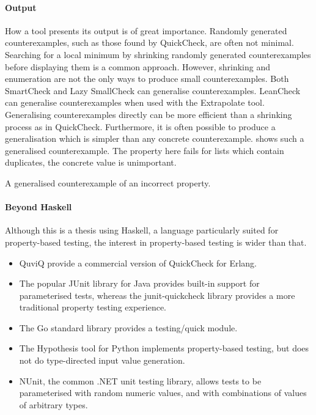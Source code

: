 \paragraph{Output}
How a tool presents its output is of great importance.  Randomly
generated counterexamples, such as those found by
QuickCheck\cite{claessen2000}, are often not minimal.  Searching for a
local minimum by shrinking randomly generated counterexamples before
displaying them is a common approach.  However, shrinking and
enumeration are not the only ways to produce small counterexamples.
Both SmartCheck\cite{pike2014} and Lazy SmallCheck\cite{runciman2008}
can generalise counter\-examples.  LeanCheck\cite{leancheck} can
generalise counterexamples when used with the
Extrapolate\cite{braquehais2017ifl} tool.  Generalising
counterexamples directly can be more efficient than a shrinking
process as in QuickCheck\cite{pike2014}.  Furthermore, it is often
possible to produce a generalisation which is simpler than any
concrete counterexample.   shows such a generalised
counterexample.  The property here fails for lists which contain
duplicates, the concrete value is unimportant.

\begin{listing}
\centering
{}
\caption{A generalised counterexample of an incorrect property.}\label{lst:gencntr}
\end{listing}

\paragraph{Beyond Haskell}
Although this is a thesis using Haskell, a language particularly
suited for property-based testing, the interest in property-based
testing is wider than that.

\begin{itemize}
\item QuviQ provide a commercial version of QuickCheck for
  Erlang\cite{arts2006}.
\item The popular JUnit library for Java provides built-in support for
  parameterised tests\cite{parameterized_tests}, whereas the
  junit-quickcheck\cite{junit_quickcheck} library provides a more
  traditional property testing experience.
\item The Go standard library provides a
  testing/quick\cite{testing_quick} module.
\item The Hypothesis\cite{hypothesis_python} tool for Python
  implements property-based testing, but does not do type-directed
  input value generation.
\item NUnit, the common .NET unit testing library, allows tests to be
  parameterised with random numeric values\cite{random_attribute}, and with
  combinations of values of arbitrary types\cite{values_attribute}.
\end{itemize}

